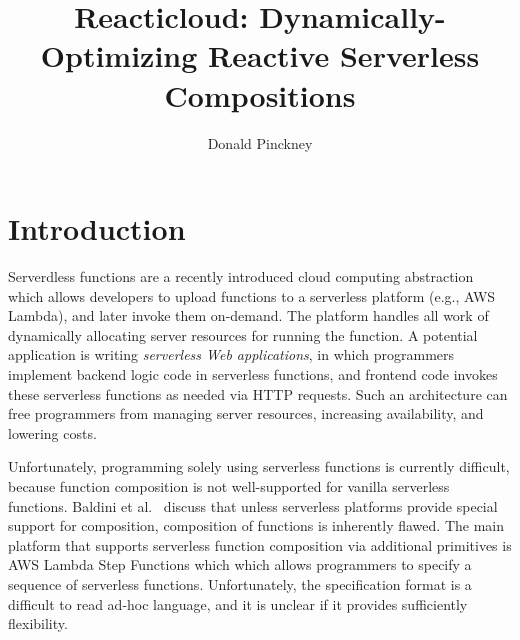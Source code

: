 \documentclass[10pt,sigplan,screen,nonacm]{acmart}
\begin{document}
\title{Reacticloud: Dynamically-Optimizing Reactive Serverless Compositions}


\author{Donald Pinckney}
\maketitle





\section{Introduction}

Serverdless functions are a recently introduced cloud
computing abstraction which allows developers to
upload functions to a serverless platform (e.g., AWS Lambda),
and later invoke them on-demand.
The platform handles all work of dynamically allocating server resources 
for running the function. A potential application is writing 
\emph{serverless Web applications}, in which programmers implement
backend logic code in serverless functions, and frontend code invokes these
serverless functions as needed via HTTP requests. 
Such an architecture can free
programmers from managing server resources, increasing availability, and lowering
costs.

Unfortunately, programming solely using serverless 
functions is currently difficult, because function 
composition is not well-supported for vanilla serverless functions.
Baldini et al.~\cite{baldini:trilemma} discuss that unless
serverless platforms provide special support for composition,
composition of functions is inherently flawed. 
The main platform that supports serverless function composition
via additional primitives is AWS Lambda Step Functions which
which allows programmers to specify a sequence of 
serverless functions. Unfortunately, the specification format is
a difficult to read ad-hoc language, 
and it is unclear if it provides sufficiently flexibility.
\end{document}
